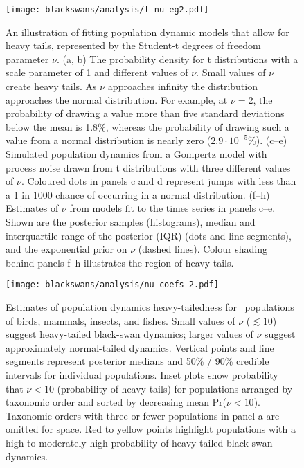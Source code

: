 \begin{figure}[htbp]
\begin{center}
\texttt{[image: blackswans/analysis/t-nu-eg2.pdf]}
\caption[An illustration of fitting population dynamic models that allow for heavy
tails, represented by the Student-t degrees of freedom parameter $\nu$.]{
An illustration of fitting population dynamic models that allow for heavy
tails, represented by the Student-t degrees of freedom parameter $\nu$. (a, b)
The probability density for t distributions with a scale parameter of 1 and
different values of $\nu$. Small values of $\nu$ create heavy tails. As $\nu$
approaches infinity the distribution approaches the normal distribution. For
example, at $\nu = 2$, the probability of drawing a value more than five
standard deviations below the mean is 1.8\%, whereas the probability of drawing
such a value from a normal distribution is nearly zero ($2.9\cdot10^{-5}$\%).
(c--e) Simulated population dynamics from a Gompertz model with process noise
drawn from t distributions with three different values of $\nu$. Coloured dots
in panels c and d represent jumps with less than a 1 in 1000 chance of
occurring in a normal distribution. (f--h) Estimates of $\nu$ from models fit
to the times series in panels c--e. Shown are the posterior samples
(histograms), median and interquartile range of the posterior (IQR) (dots and
line segments), and the exponential prior on $\nu$ (dashed lines). Colour
shading behind panels f--h illustrates the region of heavy tails.
}
\label{fig:didactic}
\end{center}
\end{figure}

\clearpage

\begin{figure}[htbp]
\begin{center}
\texttt{[image: blackswans/analysis/nu-coefs-2.pdf]}

\caption[Estimates of population dynamics heavy-tailedness for \nuCoefPopN\
  populations of birds, mammals, insects, and fishes.]{Estimates of population dynamics heavy-tailedness for \nuCoefPopN\
  populations of birds, mammals, insects, and fishes. Small values of $\nu$
  ($\lesssim 10$) suggest heavy-tailed black-swan dynamics; larger values of
  $\nu$ suggest approximately normal-tailed dynamics. Vertical points and line
  segments represent posterior medians and 50\% / 90\% credible intervals for
  individual populations. Inset plots show probability that $\nu < 10$
  (probability of heavy tails) for populations arranged by taxonomic order and
  sorted by decreasing mean Pr($\nu < 10$). Taxonomic orders with three or
  fewer populations in panel a are omitted for space. Red to yellow points
  highlight populations with a high to moderately high probability of
  heavy-tailed black-swan dynamics.}

\label{fig:nu-coefs}
\end{center}
\end{figure}
\clearpage


